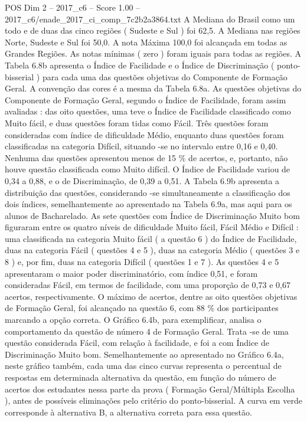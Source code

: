 \begin{textsample}{POS Dim 2 – 2017\_c6 – Score 1.00 – 2017\_c6/enade\_2017\_ci\_comp\_7c2b2a3864.txt}
A Mediana do Brasil como um todo e de duas das cinco regiões ( Sudeste e Sul ) foi 62,5.
A Mediana nas regiões Norte, Sudeste e Sul foi 50,0.
A nota Máxima 100,0 foi alcançada em todas as Grandes Regiões.
As notas mínimas ( zero ) foram iguais para todas as regiões.
A Tabela 6.8b apresenta o Índice de Facilidade e o Índice de Discriminação ( ponto-bisserial ) para cada uma das questões objetivas do Componente de Formação Geral.
A convenção das cores é a mesma da Tabela 6.8a.
As questões objetivas do Componente de Formação Geral, segundo o Índice de Facilidade, foram assim avaliadas : das oito questões, uma teve o Índice de Facilidade classificado como Muito fácil, e duas questões foram tidas como Fácil.
Três questões foram consideradas com índice de dificuldade Médio, enquanto duas questões foram classificadas na categoria Difícil, situando -se no intervalo entre 0,16 e 0,40.
Nenhuma das questões apresentou menos de 15 \% de acertos, e, portanto, não houve questão classificada como Muito difícil.
O Índice de Facilidade variou de 0,34 a 0,88, e o de Discriminação, de 0,39 a 0,51.
A Tabela 6.9b apresenta a distribuição das questões, considerando -se simultaneamente a classificação dos dois índices, semelhantemente ao apresentado na Tabela 6.9a, mas aqui para os alunos de Bacharelado.
As sete questões com Índice de Discriminação Muito bom figuraram entre os quatro níveis de dificuldade Muito fácil, Fácil Médio e Difícil : uma classificada na categoria Muito fácil ( a questão 6 ) do Índice de Facilidade, duas na categoria Fácil ( questões 4 e 5 ), duas na categoria Médio ( questões 3 e 8 ) e, por fim, duas na categoria Difícil ( questões 1 e 7 ).
As questões 4 e 5 apresentaram o maior poder discriminatório, com índice 0,51, e foram consideradas Fácil, em termos de facilidade, com uma proporção de 0,73 e 0,67 acertos, respectivamente.
O máximo de acertos, dentre as oito questões objetivas de Formação Geral, foi alcançado na questão 6, com 88 \% dos participantes marcando a opção correta.
O Gráfico 6.4b, para exemplificar, analisa o comportamento da questão de número 4 de Formação Geral.
Trata -se de uma questão considerada Fácil, com relação à facilidade, e foi a com Índice de Discriminação Muito bom.
Semelhantemente ao apresentado no Gráfico 6.4a, neste gráfico também, cada uma das cinco curvas representa o percentual de respostas em determinada alternativa da questão, em função do número de acertos dos estudantes nessa parte da prova ( Formação Geral/Múltipla Escolha ), antes de possíveis eliminações pelo critério do ponto-bisserial.
A curva em verde corresponde à alternativa B, a alternativa correta para essa questão.

\end{textsample}
